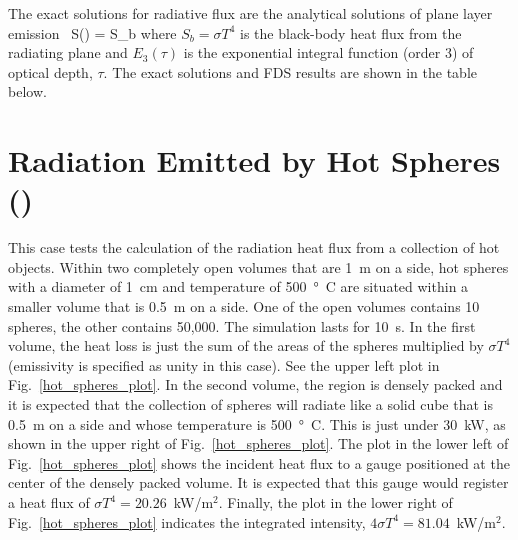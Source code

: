 \documentclass[11pt]{book}
\begin{document}
The exact solutions for radiative flux are the analytical solutions of plane layer emission~\cite{Zeldovich:1}
\be S(\tau) = S_b \ee
where $S_b = \sigma T^4$ is the black-body heat flux from the radiating plane and $E_3(\tau)$ is the exponential
integral function (order 3) of optical depth, $\tau$. The exact solutions and FDS results are shown in the table below.




\clearpage

\section{Radiation Emitted by Hot Spheres (\texorpdfstring{}{hot\_spheres}) }
\label{hot_spheres}

This case tests the calculation of the radiation heat flux from a collection of hot objects. Within two
completely open volumes that are 1~m on a side, hot spheres with a diameter of 1~cm and temperature of 500~\si{\degree C} are
situated within a smaller volume that is 0.5~m on a side. One of the open volumes contains 10 spheres, the other contains
50,000. The simulation lasts for
10~s. In the first volume, the heat loss is just the sum
of the areas of the spheres multiplied by $\sigma T^4$ (emissivity is specified as unity in this case). See
the upper left plot in Fig.~\ref{hot_spheres_plot}. In the second
volume, the region is densely packed and it is expected that the collection of spheres will radiate like a solid cube  that is
0.5~m on a side and whose temperature is 500~\si{\degree C}. This is just under 30~kW, as
shown in the upper right of Fig.~\ref{hot_spheres_plot}. The plot in the lower left of Fig.~\ref{hot_spheres_plot}
shows the incident heat flux to a gauge positioned at the center of the densely packed volume.
It is expected that this gauge would register a heat flux of
$\sigma T^4=20.26$~kW/m$^2$. Finally, the plot in the lower right of Fig.~\ref{hot_spheres_plot} indicates the
integrated intensity, $4 \sigma T^4=81.04$~kW/m$^2$.
\end{document}
